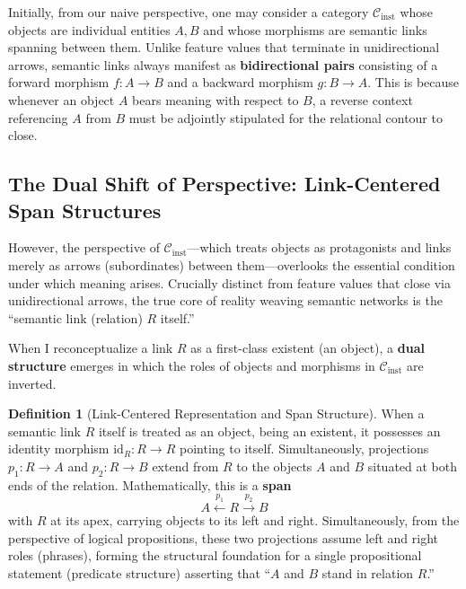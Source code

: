 \documentclass[11pt,a4paper]{article}
\theoremstyle{definition}
\newtheorem{definition}{Definition}[section]
\theoremstyle{plain}
\begin{document}
Initially, from our naive perspective, one may consider a category $\mathcal{C}_{\mathrm{inst}}$ whose objects are individual entities $A, B$ and whose morphisms are semantic links spanning between them. Unlike feature values that terminate in unidirectional arrows, semantic links always manifest as \textbf{bidirectional pairs} consisting of a forward morphism $f: A \to B$ and a backward morphism $g: B \to A$. This is because whenever an object $A$ bears meaning with respect to $B$, a reverse context referencing $A$ from $B$ must be adjointly stipulated for the relational contour to close.

\subsection{The Dual Shift of Perspective: Link-Centered Span Structures}

However, the perspective of $\mathcal{C}_{\mathrm{inst}}$---which treats objects as protagonists and links merely as arrows (subordinates) between them---overlooks the essential condition under which meaning arises. Crucially distinct from feature values that close via unidirectional arrows, the true core of reality weaving semantic networks is the ``semantic link (relation) $R$ itself.''

When I reconceptualize a link $R$ as a first-class existent (an object), a \textbf{dual structure} emerges in which the roles of objects and morphisms in $\mathcal{C}_{\mathrm{inst}}$ are inverted.

\begin{definition}[Link-Centered Representation and Span Structure]
When a semantic link $R$ itself is treated as an object, being an existent, it possesses an identity morphism $\mathrm{id}_R: R \to R$ pointing to itself. Simultaneously, projections $p_1: R \to A$ and $p_2: R \to B$ extend from $R$ to the objects $A$ and $B$ situated at both ends of the relation. Mathematically, this is a \textbf{span} \cite{benabou1967}
\begin{equation*}
A \xleftarrow{p_1} R \xrightarrow{p_2} B
\end{equation*}
with $R$ at its apex, carrying objects to its left and right. Simultaneously, from the perspective of logical propositions, these two projections assume left and right roles (phrases), forming the structural foundation for a single propositional statement (predicate structure) asserting that ``$A$ and $B$ stand in relation $R$.''
\end{definition}
\end{document}
